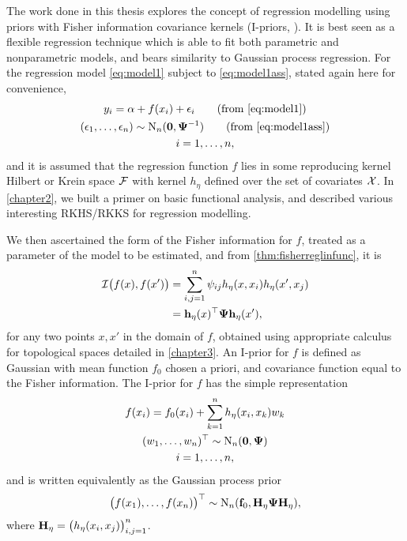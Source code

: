 \documentclass[showframe,11pt,twoside,openright]{report}
\begin{document}

The work done in this thesis explores the concept of regression modelling using priors with Fisher information covariance kernels (I-priors, \cite{bergsma2017}).
It is best seen as a flexible regression technique which is able to fit both parametric and nonparametric models, and bears similarity to Gaussian process regression.
For the regression model \cref{eq:model1} subject to \cref{eq:model1ass}, stated again here for convenience,
\begin{gather}
  y_i = \alpha + f(x_i) + \epsilon_i \tag{from \ref{eq:model1}} \\
  (\epsilon_1,\dots,\epsilon_n) \sim \N_n(\bzero,\bPsi^{-1}) \tag{from \ref{eq:model1ass}} \\
  i = 1,\dots,n, \nonumber
\end{gather}
and it is assumed that the regression function $f$ lies in some reproducing kernel Hilbert or Krein space ${\mathcal F}$ with kernel $h_\eta$ defined over the set of covariates ${\mathcal X}$.
In \cref{chapter2}, we built a primer on basic functional analysis, and described various interesting RKHS/RKKS for regression modelling.

We then ascertained the form of the Fisher information for $f$, treated as a parameter of the model to be estimated, and from \cref{thm:fisherreglinfunc}, it is
\begin{align*}
  {\mathcal I}\big(f(x),f(x') \big) 
  &= \sum_{i,j=1}^n \psi_{ij} h_\eta(x,x_i) h_\eta(x',x_j) \\
  &= {\mathbf h}_\eta(x)^\top{\bm\Psi}{\mathbf h}_\eta(x'), 
\end{align*}
for any two points $x,x'$ in the domain of $f$, obtained using appropriate calculus for topological spaces detailed in \cref{chapter3}.
An I-prior for $f$ is defined as Gaussian with mean function $f_0$ chosen a priori, and covariance function equal to the Fisher information.
The I-prior for $f$ has the simple representation
\begin{gather*}
  f(x_i) = f_0(x_i) + \sum_{k=1}^n h_\eta(x_i,x_k)w_k \\
  (w_1,\dots,w_n)^\top \sim \operatorname{N}_n({\mathbf 0},{\bm\Psi}) \\
  i=1,\dots,n,
\end{gather*}
and is written equivalently as the Gaussian process prior
\begin{equation*}
  \big(f(x_1),\dots,f(x_n) \big)^\top \sim \operatorname{N}_n({\mathbf f}_0, {\mathbf H}_\eta{\bm\Psi}{\mathbf H}_\eta),
\end{equation*}
where ${\mathbf H}_\eta=\big( h_\eta(x_i,x_j) \big)_{i,j=1}^n$.
\end{document}
